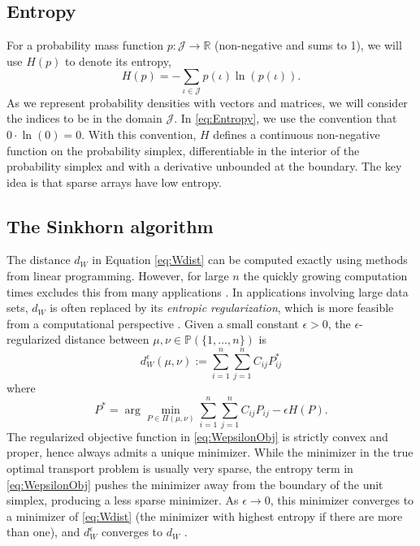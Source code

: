 \documentclass[conference]{IEEEtran}
\newcommand{\R}{{\mathbb{R}}}
\newcommand{\bbP}{{\mathbb{P}}}
\begin{document}
\subsection{Entropy}\label{sec:Entropy}
For a probability mass function $p:\mathcal J\rightarrow \R$ (non-negative and sums to 1), we will use $H(p)$ to denote its entropy,
\begin{equation} 
    H(p) = -\sum_{\iota \in \mathcal J} p(\iota) \ln(p(\iota)) \label{eq:Entropy}. 
\end{equation}
As we represent probability densities with vectors and matrices, we will consider the indices to be in the domain $\mathcal J$.
In \eqref{eq:Entropy}, we use the convention that $0\cdot\ln(0) = 0$. With this convention, $H$ defines a continuous non-negative function on the probability simplex, differentiable in the interior of the probability simplex and with a derivative unbounded at the boundary. The key idea is that sparse arrays have low entropy.


\subsection{The Sinkhorn algorithm}\label{sec:Sinkhorn}

The distance $d_W$ in Equation \eqref{eq:Wdist} 
can be computed exactly using methods from linear programming. However, for large $n$ the quickly growing computation times excludes this from many applications \cite{cuturi}. In applications involving large data sets, $d_W$ is often replaced by its \emph{entropic regularization}, which is more feasible from a computational perspective \cite{peyre}. Given a small constant $\epsilon>0$, the $\epsilon$-regularized distance between $\mu,\nu\in \bbP(\{1,\ldots,n\})$ is 
\begin{equation} \label{eq:Wepsilon}
    d_W^\epsilon(\mu,\nu) := \sum_{i=1}^n \sum_{j=1}^n C_{ij}P^*_{ij}
\end{equation}
where 
\begin{equation}
    P^* = \arg\min_{P\in \Pi(\mu,\nu)} \sum_{i=1}^n \sum_{j=1}^n C_{ij}P_{ij} - \epsilon H(P).
    \label{eq:WepsilonObj}
\end{equation}
The regularized objective function in \eqref{eq:WepsilonObj} is strictly convex and proper, hence always admits a unique minimizer. While the minimizer in the true optimal transport problem is usually very sparse, the entropy term in \eqref{eq:WepsilonObj} pushes the minimizer away from the boundary of the unit simplex, producing a less sparse minimizer. As $\epsilon\rightarrow 0$, this minimizer converges to a minimizer of \eqref{eq:Wdist} (the minimizer with highest entropy if there are more than one), and $d_W^\epsilon$ converges to $d_W$ \cite{peyre}. 
\end{document}
